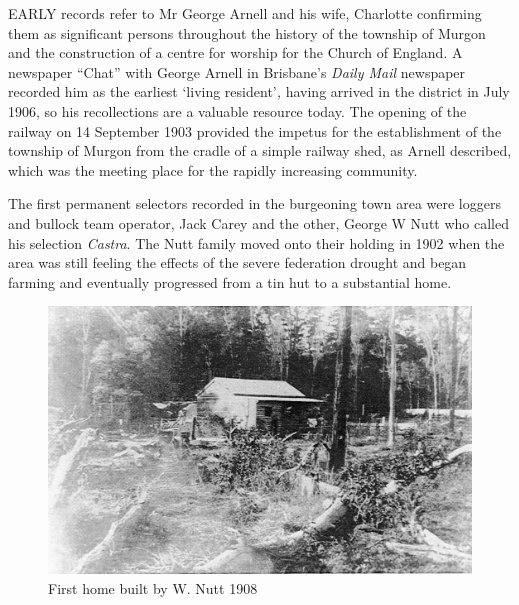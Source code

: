 \lettrine[lines=3]{E}{ARLY}
 records refer to Mr George Arnell and his wife, Charlotte confirming them as significant persons throughout the history of the township of Murgon and the construction of a centre for worship for the Church of England. A newspaper ``Chat'' with George Arnell in Brisbane's \emph{Daily Mail} newspaper recorded him as the earliest `living resident'\emph{,} having arrived in the district in July 1906, so his recollections are a valuable resource today. The opening of the railway on 14 September 1903 provided the impetus for the establishment of the township of Murgon from the cradle of a simple railway shed, as Arnell described, which was the meeting place for the rapidly increasing community.

The first permanent selectors recorded in the burgeoning town area were loggers and bullock team operator, Jack Carey and the other, George W Nutt who called his selection \emph{Castra}. The Nutt family moved onto their holding in 1902 when the area was still feeling the effects of the severe federation drought and began farming and eventually progressed from a tin hut to a substantial home.









\begin{figure}
\begin{center}
\includegraphics[width=1.\linewidth,center]{../images/HouseWNutt1908.jpg}
\caption{First home built by W. Nutt 1908}
\end{center}
\end{figure}




